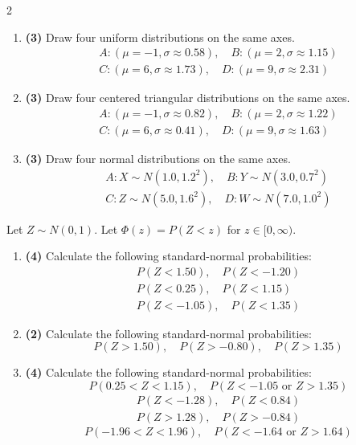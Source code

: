 \begin{multicols}{2}
		\begin{enumerate}[label=\textbf{\alph*)}]
			\item \textbf{(3)} Draw four uniform distributions on the same axes.
			\[
			\begin{aligned}
				A:(\mu=-1,\sigma\approx0.58),\quad B:(\mu=2,\sigma\approx1.15)\\
				C:(\mu=6,\sigma\approx1.73),\quad D:(\mu=9,\sigma\approx2.31)
			\end{aligned}
			\]
			\item \textbf{(3)} Draw four centered triangular distributions on the same axes. 
			\[
			\begin{aligned}
				A:(\mu=-1,\sigma\approx0.82),\quad B:(\mu=2,\sigma\approx1.22)\\
				C:(\mu=6,\sigma\approx0.41),\quad D:(\mu=9,\sigma\approx1.63)
			\end{aligned}
			\]
			
			\item \textbf{(3)} Draw four normal distributions on the same axes. 
			\[
			\begin{aligned}
				A:X\sim N(1.0,1.2^2),\quad B:Y\sim N(3.0,0.7^2)\\
				C:Z\sim N(5.0,1.6^2),\quad D:W\sim N(7.0,1.0^2)
			\end{aligned}
			\]
		\end{enumerate}
		
		\vspace{0.25cm}
		\vspace{-0.3cm}
		Let \(Z\sim N(0,1)\). Let \(\Phi(z)=P(Z<z)\) for \(z\in[0,\infty)\).
		
		
		\begin{enumerate}[label=\textbf{\alph*)}]
			\item \textbf{(4)} Calculate the following standard-normal probabilities:
			\[
			\begin{aligned}
				P(Z<1.50),\quad P(Z<-1.20)\\
				P(Z<0.25),\quad P(Z<1.15)\\
				P(Z<-1.05),\quad P(Z<1.35)
			\end{aligned}
			\]
			
			\item \textbf{(2)} Calculate the following standard-normal probabilities:
			\[
			P(Z>1.50),\quad
			P(Z>-0.80),\quad
			P(Z>1.35)
			\]
			
			\item \textbf{(4)} Calculate the following standard-normal probabilities:
			\[
			P(0.25<Z<1.15),\quad
			P(Z<-1.05\text{ or }Z>1.35)
			\]
			\[
			\begin{aligned}
				P(Z<-1.28),\quad P(Z<0.84)\\
				P(Z>1.28),\quad P(Z>-0.84)
			\end{aligned}
			\]
			\[
			P(-1.96<Z<1.96),\quad
			P(Z<-1.64\text{ or }Z>1.64)
			\]
		\end{enumerate}
		

\end{multicols}
